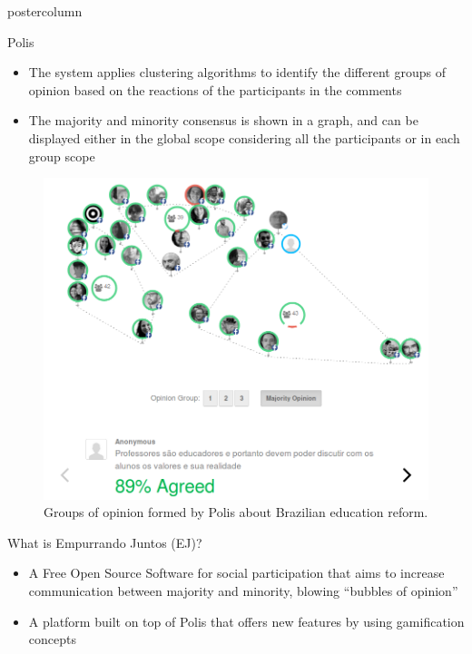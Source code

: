 \documentclass[final,hyperref={pdfpagelabels=false}]{beamer}
\begin{document}
\begin{frame}
\begin{columns}
\begin{column}{.49\textwidth}
\begin{beamercolorbox}[center,wd=\textwidth]{postercolumn}
\begin{minipage}[T]{.95\textwidth}
{\begin{block}{Polis}
\begin{itemize}
    \item The system applies clustering algorithms to identify the different groups
    of opinion based on the reactions of the participants in the comments

    \item The majority and minority consensus is shown in a graph, and can be
    displayed either in the global scope considering all the participants or in each group
    scope
  \end{itemize}

  \begin{figure}
    \begin{center}
      \includegraphics[scale=1.1]{../images/polis3.png}
      \caption{Groups of opinion formed by Polis about Brazilian education reform.}
      \label{fig:group-clusters}
    \end{center}
  \end{figure}
\end{block}

\begin{block}{What is Empurrando Juntos (EJ)?}

  \begin{itemize}
    \item A Free Open Source Software for social participation that aims to
    increase communication between majority and minority, blowing ``bubbles of
    opinion''

    \item A platform built on top of Polis that offers new features
    by using gamification concepts


\end{itemize}
\end{block}}
\end{minipage}
\end{beamercolorbox}
\end{column}
\end{columns}
\end{frame}
\end{document}
